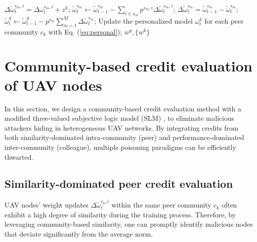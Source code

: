 \documentclass[lettersize,journal]{IEEEtran}
\begin{document}
\begin{algorithm}[!t]
\begin{algorithmic} [1]
                        \State $\Delta \widetilde{\omega}_{t}^{s_{m},i}=\Delta \omega_{t}^{s_{m},i}+z^{k}$;
                    \EndFor
                    \State $\widetilde{\omega}_{t}^{s_{m}} \leftarrow \widetilde{\omega}_{t-1}^{s_{m}} -  \sum_{i \in s_{m}} p^{s_{m}, i}\Delta \widetilde{\omega}_{t}^{s_{m},i}$;
                    \State $\Delta\widetilde{\omega}_{t}^{s_{m}} =  \widetilde{\omega}_{t-1}^{s_{m}}-\widetilde{\omega}_{t}^{s_{m}}$;
                \EndFor
                \State $\widetilde{\omega}^g_{t} \leftarrow \widetilde{\omega}^g_{t-1} - p^{s_{m}} \sum_{m=1}^{M} \Delta\widetilde{\omega}_{t}^{s_{m}}$;%
                    \State Update the personalized model $\omega_{t}^{k}$ for each peer community $c_k$ with Eq. (\ref{eq:personal});%
\State \Return $w^g,\{w^k\}$
\end{algorithmic}
\end{algorithm}


\section{Community-based credit evaluation of UAV nodes}
In this section, we design a community-based credit evaluation method with a modified three-valued subjective logic model (SLM) \cite{al2021subjective}, to eliminate malicious attackers hiding in heterogeneous UAV networks. By integrating credits from both similarity-dominated intra-community (peer) and performance-dominated inter-community (colleague), multiple poisoning paradigms can be efficiently thwarted. 
\subsection{Similarity-dominated peer credit evaluation}
UAV nodes' weight updates $\Delta\widetilde{\omega}^{c_k, i}_{t}$ within the same peer community $c_k$ often exhibit a high degree of similarity during the training process. Therefore, by leveraging community-based similarity, one can promptly identify malicious nodes that deviate significantly from the average norm.
\end{document}
